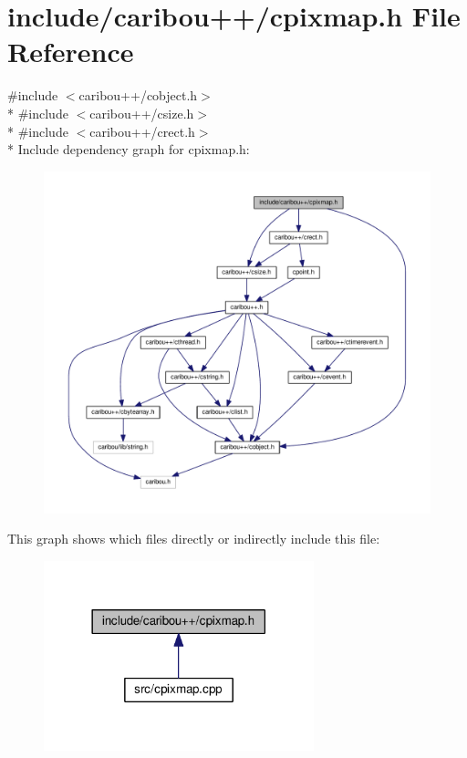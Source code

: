 \section{include/caribou++/cpixmap.h File Reference}
\label{cpixmap_8h}
{\ttfamily \#include $<$caribou++/cobject.\-h$>$}\\*
{\ttfamily \#include $<$caribou++/csize.\-h$>$}\\*
{\ttfamily \#include $<$caribou++/crect.\-h$>$}\\*
Include dependency graph for cpixmap.\-h\-:\nopagebreak
\begin{figure}[H]
\begin{center}
\leavevmode
\includegraphics[width=350pt]{cpixmap_8h__incl}
\end{center}
\end{figure}
This graph shows which files directly or indirectly include this file\-:\nopagebreak
\begin{figure}[H]
\begin{center}
\leavevmode
\includegraphics[width=222pt]{cpixmap_8h__dep__incl}
\end{center}
\end{figure}
